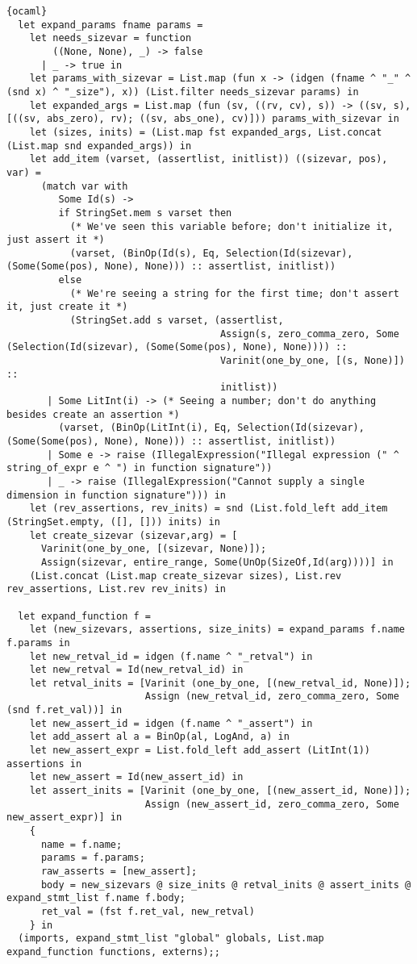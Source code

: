\begin{lstlisting}{ocaml}
  let expand_params fname params =
    let needs_sizevar = function
        ((None, None), _) -> false
      | _ -> true in
    let params_with_sizevar = List.map (fun x -> (idgen (fname ^ "_" ^ (snd x) ^ "_size"), x)) (List.filter needs_sizevar params) in
    let expanded_args = List.map (fun (sv, ((rv, cv), s)) -> ((sv, s), [((sv, abs_zero), rv); ((sv, abs_one), cv)])) params_with_sizevar in
    let (sizes, inits) = (List.map fst expanded_args, List.concat (List.map snd expanded_args)) in
    let add_item (varset, (assertlist, initlist)) ((sizevar, pos), var) =
      (match var with
         Some Id(s) ->
         if StringSet.mem s varset then
           (* We've seen this variable before; don't initialize it, just assert it *)
           (varset, (BinOp(Id(s), Eq, Selection(Id(sizevar), (Some(Some(pos), None), None))) :: assertlist, initlist))
         else
           (* We're seeing a string for the first time; don't assert it, just create it *)
           (StringSet.add s varset, (assertlist,
                                     Assign(s, zero_comma_zero, Some (Selection(Id(sizevar), (Some(Some(pos), None), None)))) ::
                                     Varinit(one_by_one, [(s, None)]) ::
                                     initlist))
       | Some LitInt(i) -> (* Seeing a number; don't do anything besides create an assertion *)
         (varset, (BinOp(LitInt(i), Eq, Selection(Id(sizevar), (Some(Some(pos), None), None))) :: assertlist, initlist))
       | Some e -> raise (IllegalExpression("Illegal expression (" ^ string_of_expr e ^ ") in function signature"))
       | _ -> raise (IllegalExpression("Cannot supply a single dimension in function signature"))) in
    let (rev_assertions, rev_inits) = snd (List.fold_left add_item (StringSet.empty, ([], [])) inits) in
    let create_sizevar (sizevar,arg) = [
      Varinit(one_by_one, [(sizevar, None)]);
      Assign(sizevar, entire_range, Some(UnOp(SizeOf,Id(arg))))] in
    (List.concat (List.map create_sizevar sizes), List.rev rev_assertions, List.rev rev_inits) in

  let expand_function f =
    let (new_sizevars, assertions, size_inits) = expand_params f.name f.params in
    let new_retval_id = idgen (f.name ^ "_retval") in
    let new_retval = Id(new_retval_id) in
    let retval_inits = [Varinit (one_by_one, [(new_retval_id, None)]);
                        Assign (new_retval_id, zero_comma_zero, Some (snd f.ret_val))] in
    let new_assert_id = idgen (f.name ^ "_assert") in
    let add_assert al a = BinOp(al, LogAnd, a) in
    let new_assert_expr = List.fold_left add_assert (LitInt(1)) assertions in
    let new_assert = Id(new_assert_id) in
    let assert_inits = [Varinit (one_by_one, [(new_assert_id, None)]);
                        Assign (new_assert_id, zero_comma_zero, Some new_assert_expr)] in
    {
      name = f.name;
      params = f.params;
      raw_asserts = [new_assert];
      body = new_sizevars @ size_inits @ retval_inits @ assert_inits @ expand_stmt_list f.name f.body;
      ret_val = (fst f.ret_val, new_retval)
    } in
  (imports, expand_stmt_list "global" globals, List.map expand_function functions, externs);;


\end{lstlisting}
